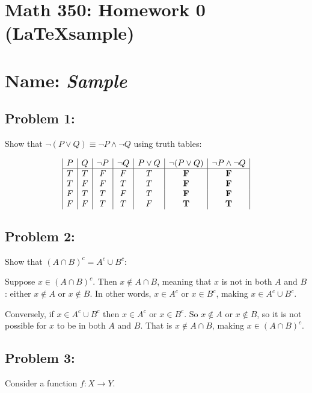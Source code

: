 \documentclass[11pt]{article}
\begin{document}
\setlength{\parindent}{0pt}
\setlength{\parskip}{8pt}


\section*{Math 350: Homework 0 (\LaTeX sample)}
\section*{Name: {\it Sample}}

\subsection*{Problem 1: }

Show that $\neg (P\lor Q) \equiv \neg P \land \neg Q$ using truth tables:


$$
\begin{array}{|c|c|c|c|c|c|c|}
P & Q & \neg P & \neg Q & P\lor Q& \neg(P\lor Q) & \neg P \land \neg Q\\
\hline
T & T & F& F& T& \bf F & \bf F \\
T & F & F& T& T& \bf F & \bf F \\
F & T & T& F& T& \bf F & \bf F \\
F & F & T& T& F& \bf T & \bf T \\
\end{array}
$$


\subsection*{Problem 2: }

Show that $(A\cap B)^c = A^c \cup B^c$:

Suppose $x\in  (A\cap B)^c$. Then $x\not \in A\cap B$, meaning that $x$ is not in both $A$ and $B$: either $x\not \in A$ or $x\not \in B$. In other words,  $x\in A^c$ or $x\in B^c$, making $x\in A^c \cup B^c$.

Conversely, if $x \in A^c \cup B^c$ then $x\in A^c$ or $x\in B^c$. So $x\not \in A$ or $x\not \in B$, so it is not possible for $x$ to be in both $A$ and $B$. That is $x\not\in A\cap B$, making $x\in (A\cap B)^c$.



\subsection*{Problem 3: }

Consider a function $f:X\to Y$.
\end{document}
